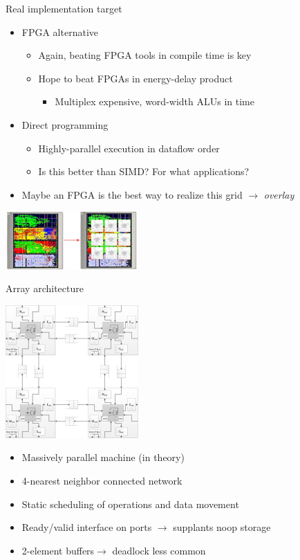 \documentclass{beamer}
\begin{document}
\begin{frame}{Real implementation target}
\begin{itemize}
\item FPGA alternative
\begin{itemize}
\item Again, beating FPGA tools in compile time is key
\item Hope to beat FPGAs in energy-delay product
\begin{itemize}
\item Multiplex expensive, word-width ALUs in time
\end{itemize}
\end{itemize}
\item Direct programming
\begin{itemize}
\item Highly-parallel execution in dataflow order
\item Is this better than SIMD? {\color{red}For what applications?}
\end{itemize}
\item Maybe an FPGA is the best way to realize this grid $\rightarrow$ \textit{overlay}
\end{itemize}
\begin{center}
\includegraphics[width=2in]{overlay.png}
\end{center}
\end{frame}

\begin{frame}{Array architecture}
\begin{center}
\includegraphics[width=2in]{array_4x4.png}
\end{center}
\begin{itemize}
\item Massively parallel machine (in theory)
\item 4-nearest neighbor connected network
\item Static scheduling of operations and data movement
\item Ready/valid interface on ports $\rightarrow$ supplants noop storage
\item 2-element buffers$\rightarrow$ deadlock less common
\end{itemize}
\end{frame}
\end{document}

